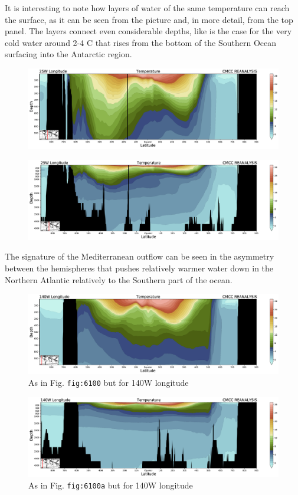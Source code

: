 It is interesting to note how layers of water of the same temperature
can reach the surface, as it can be seen from the picture and, in more
detail, from the top panel. The layers connect even considerable depths,
like is the case for the very cold water around 2-4 C that rises from
the bottom of the Southern Ocean surfacing into the Antarctic region.

\begin{figure}
\centering
\includegraphics[width = .7 \textwidth]{figs/GD/Sect25W1000.png}
\caption{} \label{fig:}
\end{figure}

\begin{figure}
\centering
\includegraphics[width = .7 \textwidth]{figs/GD/Sect25W5000.png}
\caption{} \label{fig:}
\end{figure}

The signature of the Mediterranean outflow can be seen in the asymmetry
between the hemispheres that pushes relatively warmer water down in the
Northern Atlantic relatively to the Southern part of the ocean.

\begin{figure}
\centering
\includegraphics[width = .7 \textwidth]{figs/GD/Sect140W1000.png}
\caption{As in Fig. \texttt{fig:6100} but for 140W longitude}
\end{figure}

\begin{figure}
\centering
\includegraphics[width = .7 \textwidth]{figs/GD/Sect140W5000.png}
\caption{As in Fig. \texttt{fig:6100a} but for 140W longitude}
\end{figure}

